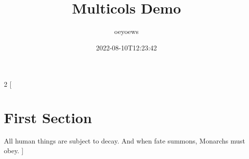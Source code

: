 \documentclass{article}
\title{Multicols Demo}
\author{oeyoews}
\date{2022-08-10T12:23:42}
\begin{document}
\maketitle

\begin{multicols}{2}
	[
		\section{First Section}
		All human things are subject to decay. And when fate summons, Monarchs must obey.
	]
	\blindtext\blindtext
\end{multicols}
\end{document}
